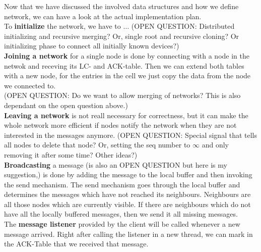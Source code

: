 Now that we have discussed the involved data structures and how we define network, we can have a look at the actual implementation plan. \\
To \textbf{initialize} the network, we have to $\ldots$ (OPEN QUESTION: Distributed initializing and recursive merging? Or, single root and recursive cloning? Or initializing phase to connect all initially known devices?) \\
\textbf{Joining a network} for a single node is done by connecting with a node in the netwok and receving its LC- and ACK-table. Then we can extend both tables with a new node, for the entries in the cell we just copy the data from the node we connected to. \\ 
(OPEN QUESTION: Do we want to allow merging of networks? This is also dependant on the open question above.) \\
\textbf{Leaving a network} is not reall necessary for correctness, but it can make the whole network more efficient if nodes notify the network when they are not interested in the messages anymore. (OPEN QUESTION: Special signal that tells all nodes to delete that node? Or, setting the seq number to $\infty$ and only removing it after some time? Other ideas?)\\
\textbf{Broadcasting} a message (is also an OPEN QUESTION but here is my suggestion,) is done by adding the message to the local buffer and then invoking the send mechanism. The send mechanism goes through the local buffer and determines the messages which have not reached its neighbours. Neighbours are all those nodes which are currently visible. If there are neighbours which do not have all the locally buffered messages, then we send it all missing messages.\\
The \textbf{message listener} provided by the client will be called whenever a new message arrived. Right after calling the listener in a new thread, we can mark in the ACK-Table that we received that message.  \\


			
		
